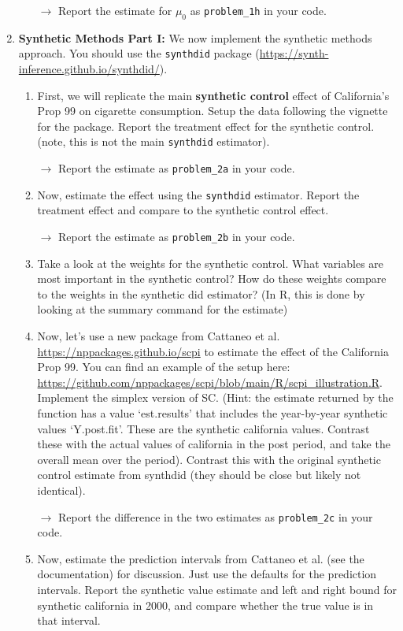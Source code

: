 \documentclass[11pt, a4paper]{article}
\begin{document}
\begin{enumerate}
\begin{enumerate}
        \hspace{10pt} $\rightarrow$ Report the estimate for $\mu_{0}$ as \texttt{problem\_1h} in your code. 
      \end{enumerate}
    \item \textbf{Synthetic Methods Part I:} We now implement the synthetic methods approach. You should use the \texttt{synthdid} package (\url{https://synth-inference.github.io/synthdid/}). 
    \begin{enumerate}
    \item First, we will replicate the main \textbf{synthetic control} effect of California's Prop 99 on cigarette consumption. Setup the data following the vignette for the package. Report the treatment effect for the synthetic control. (note, this is not the main \texttt{synthdid} estimator). 
    
    \hspace{10pt} $\rightarrow$ Report the estimate as   \texttt{problem\_2a} in your code. 
    \item Now, estimate the effect using the \texttt{synthdid} estimator. Report the treatment effect and compare to the synthetic control effect.
    
    \hspace{10pt} $\rightarrow$ Report the estimate as   \texttt{problem\_2b} in your code. 
    \item Take a look at the weights for the synthetic control. What variables are most important in the synthetic control? How do these weights compare to the weights in the synthetic did estimator? (In R, this is done by looking at the summary command for the estimate)
    
    \item Now, let's use a new package from Cattaneo et al. \url{https://nppackages.github.io/scpi} to estimate the effect of the California Prop 99. You can find an example of the setup here: \url{https://github.com/nppackages/scpi/blob/main/R/scpi_illustration.R}. Implement the simplex version of SC. (Hint: the estimate returned by the function has a value `est.results' that includes the year-by-year synthetic values `Y.post.fit'. These are the synthetic california values. Contrast these with the actual values of california in the post period, and take the overall mean over the period). Contrast this with the original synthetic control estimate from synthdid (they should be close but likely not identical). 
    
    \hspace{10pt} $\rightarrow$ Report the difference in the two estimates as   \texttt{problem\_2c} in your code. 
    \item Now, estimate the prediction intervals from Cattaneo et al. (see the documentation) for discussion. Just use the defaults for the prediction intervals. Report the synthetic value estimate and  left and right bound for synthetic california in 2000, and compare whether the true value is in that interval.
    

\end{enumerate}
\end{enumerate}
\end{document}
